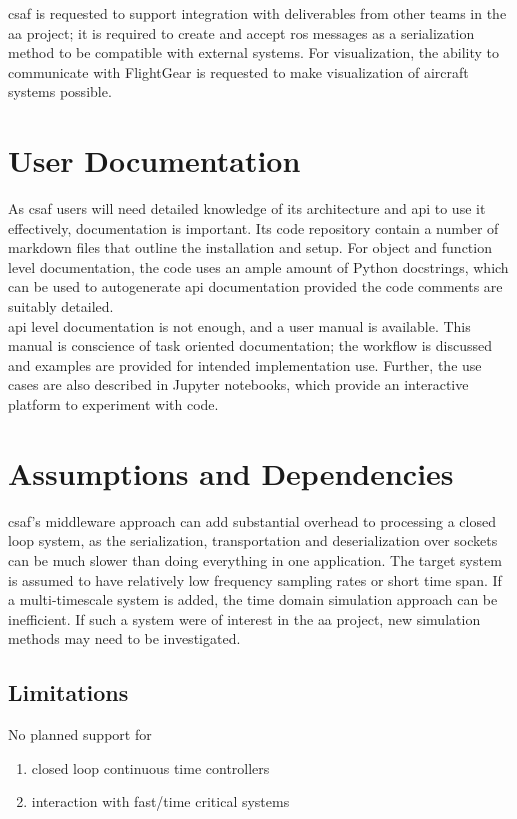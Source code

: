 \acrshort{csaf} is requested to support integration with deliverables from other teams in the \acrshort{aa} 
project; it is required to create and accept \acrshort{ros} messages as a serialization method to be 
compatible with external systems. For visualization, the ability to communicate with FlightGear is requested 
to make visualization of aircraft systems possible. \\

\section{User Documentation}

As \acrshort{csaf} users will need detailed knowledge of its architecture and \acrshort{api} to use it 
effectively, documentation is important. Its code repository contain a number of markdown files that outline 
the installation and setup. For object and function level documentation, the code uses an ample amount of 
Python docstrings, which can be used to autogenerate \acrshort{api} documentation provided the code 
comments are suitably detailed. \\

\acrshort{api} level documentation is not enough, and a user manual is available. This manual is conscience 
of task oriented documentation; the workflow is discussed and examples are provided for intended 
implementation use. Further, the use cases are also described in Jupyter notebooks, which provide an 
interactive platform to experiment with code.

\section{Assumptions and Dependencies}

\acrshort{csaf}'s middleware approach can add substantial overhead to processing a closed loop system, as 
the serialization, transportation and deserialization over sockets can be much slower than doing everything in 
one application. The target system is assumed to have relatively low frequency sampling rates or short time 
span. If a multi-timescale system is added, the time domain simulation approach can be inefficient. If such a 
system were of interest in the \acrshort{aa} project, new simulation methods may need to be investigated.\\

\subsection{Limitations}

No planned support for
\begin{enumerate}
\item closed loop continuous time controllers
\item interaction with fast/time critical systems
\end{enumerate}

